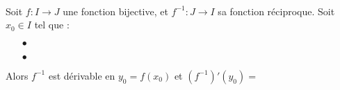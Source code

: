 \documentclass[a4paper, 11pt]{article}
\begin{document}
{{\begin{theorem} \quad \\
	Soit $f: I\rightarrow J$ une fonction bijective, et $f^{-1}: J\rightarrow I$ sa fonction r\'eciproque. Soit $x_0 \in I$ tel que :
	\begin{itemize}
		\item[$\bullet$] \dotfill%
		\item[$\bullet$] \dotfill%
	\end{itemize}
	Alors $f^{-1}$ est d\'erivable en $y_0=f(x_0)$ et $(f^{-1})'(y_0) =$ \vsec\vsec\vsec
\end{theorem}
}




\setlength\fboxrule{1pt}


}
\end{document}
